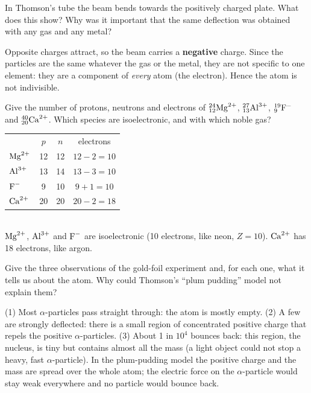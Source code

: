 In Thomson's tube the beam bends towards the positively charged plate. What does this show?
Why was it important that the same deflection was obtained with any gas and any metal?
\begin{solution}
Opposite charges attract, so the beam carries a \textbf{negative} charge. Since the particles are the
same whatever the gas or the metal, they are not specific to one element: they are a component of
\emph{every} atom (the electron). Hence the atom is not indivisible.
\end{solution}

Give the number of protons, neutrons and electrons of ${}^{24}_{12}\mathrm{Mg}^{2+}$, ${}^{27}_{13}\mathrm{Al}^{3+}$,
${}^{19}_{9}\mathrm{F}^{-}$ and ${}^{40}_{20}\mathrm{Ca}^{2+}$. Which species are isoelectronic, and with which noble
gas?
\begin{solution}
\begin{tabular}{@{}lccc@{}}
 & $p$ & $n$ & electrons\\
$\ce{Mg^2+}$ & 12 & 12 & $12-2 = 10$\\
$\ce{Al^3+}$ & 13 & 14 & $13-3 = 10$\\
$\ce{F-}$ & 9 & 10 & $9+1 = 10$\\
$\ce{Ca^2+}$ & 20 & 20 & $20-2 = 18$
\end{tabular}\\
$\ce{Mg^2+}$, $\ce{Al^3+}$ and $\ce{F-}$ are isoelectronic (10 electrons, like neon, $Z = 10$).
$\ce{Ca^2+}$ has 18 electrons, like argon.
\end{solution}

Give the three observations of the gold-foil experiment and, for each one, what it tells us about the
atom. Why could Thomson's ``plum pudding'' model not explain them?
\begin{solution}
(1) Most $\alpha$-particles pass straight through: the atom is mostly empty.
(2) A few are strongly deflected: there is a small region of concentrated positive charge that repels
the positive $\alpha$-particles.
(3) About 1 in $10^4$ bounces back: this region, the nucleus, is tiny but contains almost all the mass
(a light object could not stop a heavy, fast $\alpha$-particle).
In the plum-pudding model the positive charge and the mass are spread over the whole atom; the electric
force on the $\alpha$-particle would stay weak everywhere and no particle would bounce back.
\end{solution}

